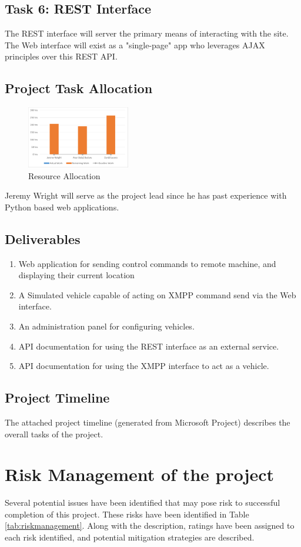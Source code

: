 \documentclass[conference,12pt]{IEEEtran}
\begin{document}
\subsection{Task 6: REST Interface}
The REST interface will server the primary means of interacting with the site.
The Web interface will exist as a "single-page" app who leverages AJAX
principles over this REST API. 
\subsection{Project Task Allocation}

\begin{figure}
\centering
\includegraphics[width=0.4\textwidth]{ResourceAllocation.pdf}
\caption{Resource Allocation}
\label{fig:resourceallocation}
\end{figure}
Jeremy Wright will serve as the project lead since he has past experience with
Python based web applications. 

\subsection{Deliverables}
\begin{enumerate}
\item Web application for sending control commands to remote machine, and
displaying their current location
\item A Simulated vehicle capable of acting on XMPP command send via the Web
interface.
\item An administration panel for configuring vehicles.
\item API documentation for using the REST interface as an external service.
\item API documentation for using the XMPP interface to act as a vehicle.
\end{enumerate}
\subsection{Project Timeline}
The attached project timeline (generated from Microsoft Project) describes the
overall tasks of the project.
\section{Risk Management of the project}
Several potential issues have been identified that may pose risk to successful
completion of this project. These risks have been identified in Table
\ref{tab:riskmanagement}. Along with the description, ratings have been assigned
to each risk identified, and potential mitigation strategies are described.
\end{document}
